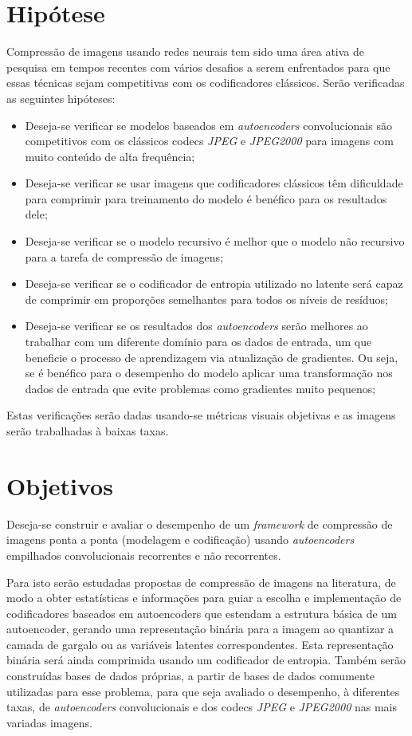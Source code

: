 \section{Hipótese}
\label{sec:hipotese}
Compressão de imagens usando redes neurais tem sido uma área ativa de pesquisa em tempos recentes com vários desafios a serem enfrentados para que essas técnicas sejam competitivas com os codificadores clássicos. Serão verificadas as seguintes hipóteses:
\begin{itemize}
    \item Deseja-se verificar se modelos baseados em \textit{autoencoders} convolucionais são competitivos com os clássicos codecs \textit{JPEG} e \textit{JPEG2000} para imagens com muito conteúdo de alta frequência;
    \item Deseja-se verificar se usar imagens que codificadores clássicos têm dificuldade para comprimir para treinamento do modelo é benéfico para os resultados dele;
    \item Deseja-se verificar se o modelo recursivo é melhor que o modelo não recursivo para a tarefa de compressão de imagens;
    \item Deseja-se verificar se o codificador de entropia utilizado no latente será capaz de comprimir em proporções semelhantes para todos os níveis de resíduos;
    \item Deseja-se verificar se os resultados dos \textit{autoencoders} serão melhores ao trabalhar com um diferente domínio para os dados de entrada, um que beneficie o processo de aprendizagem via atualização de gradientes. Ou seja, se é benéfico para o desempenho do modelo aplicar uma transformação nos dados de entrada que evite problemas como gradientes muito pequenos;
\end{itemize}

Estas verificações serão dadas usando-se métricas visuais objetivas e as imagens serão trabalhadas à baixas taxas.
\section{Objetivos}
\label{sec:objetivos}
Deseja-se construir e avaliar o desempenho de um \textit{framework} de compressão de imagens ponta a ponta (modelagem e codificação) usando \textit{autoencoders} empilhados convolucionais recorrentes e não recorrentes.

Para isto serão estudadas propostas de compressão de imagens na literatura, de modo a obter estatísticas e informações para guiar a escolha e implementação de codificadores baseados em autoencoders que estendam a estrutura básica de um autoencoder, gerando uma representação binária para a imagem ao quantizar a camada de gargalo ou as variáveis latentes correspondentes. Esta representação binária será ainda comprimida usando um codificador de entropia. Também serão construídas bases de dados próprias, a partir de bases de dados comumente utilizadas para esse problema, para que seja avaliado o desempenho, à diferentes taxas, de \textit{autoencoders} convolucionais e dos codecs \textit{JPEG} e \textit{JPEG2000} nas mais variadas imagens. 
